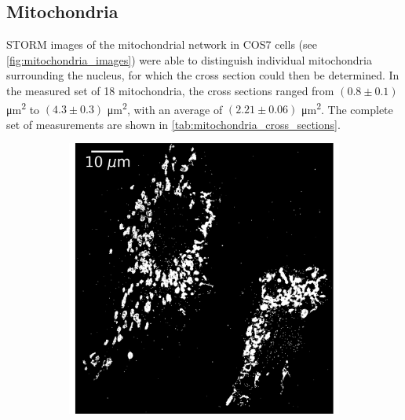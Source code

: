 \subsection{Mitochondria} \label{sec:results_mitochondria}
STORM images of the mitochondrial network in COS7 cells (see \autoref{fig:mitochondria_images}) were able to distinguish individual mitochondria surrounding the nucleus, for which the cross section could then be determined.
In the measured set of 18 mitochondria, the cross sections ranged from $(0.8 \pm 0.1)$ \unit{\micro\meter\squared} to $(4.3 \pm 0.3)$ \unit{\micro\meter\squared}, with an average of $(2.21 \pm 0.06)$ \unit{\micro\meter\squared}. The complete set of measurements are shown in \autoref{tab:mitochondria_cross_sections}.
%
\begin{figure}
    \centering
    \begin{subfigure}{0.49\textwidth}
        \includegraphics[width=\textwidth]{figures/mitochondria_image4.png}
        \caption{}
        \label{fig:mitochondria_image4}
    \end{subfigure}
    \begin{subfigure}{0.49\textwidth}

\end{subfigure}
\end{figure}
